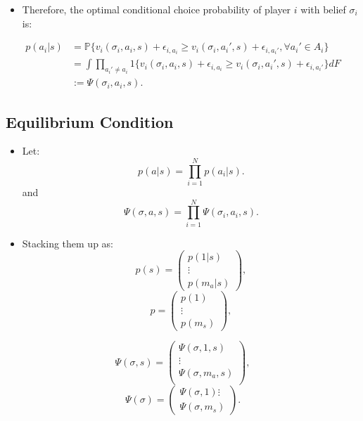 \documentclass[]{book}
\providecommand{\tightlist}{%
  \setlength{\itemsep}{0pt}\setlength{\parskip}{0pt}}
\begin{document}
\begin{itemize}
\tightlist
\item
  Therefore, the optimal conditional choice probability of player \(i\)
  with belief \(\sigma_i\) is:
\end{itemize}

\begin{equation}
\begin{split}
p(a_i|s) &= \mathbb{P}\{v_i(\sigma_i, a_i, s) + \epsilon_{i, a_i} \ge  v_i(\sigma_i, a_i', s) + \epsilon_{i, a_i'}, \forall a_i' \in A_i\}\\
&=\int \prod_{a_i' \neq a_i}1\{v_i(\sigma_i, a_i, s) + \epsilon_{i, a_i} \ge  v_i(\sigma_i, a_i', s) + \epsilon_{i, a_i'}\} d F\\
&:= \Psi(\sigma_i, a_i, s).
\end{split}
\end{equation}

\subsection{Equilibrium Condition}\label{equilibrium-condition-1}

\begin{itemize}
\tightlist
\item
  Let: \[
  p(a|s) = \prod_{i = 1}^N p(a_i|s).
  \] and \[
  \Psi(\sigma, a, s) = \prod_{i = 1}^N \Psi(\sigma_i, a_i, s).
  \]
\item
  Stacking them up as: \[
  p(s) = 
  \begin{pmatrix}
  p(1|s) \\
  \vdots \\
  p(m_a|s)
  \end{pmatrix},
  \] \[
  p = 
  \begin{pmatrix}
  p(1)\\
  \vdots\\
  p(m_s)
  \end{pmatrix},
  \]
\end{itemize}

\[
\Psi(\sigma, s) = 
\begin{pmatrix}
\Psi(\sigma, 1, s) \\
\vdots \\
\Psi(\sigma, m_a, s) \\
\end{pmatrix},
\] \[
\Psi(\sigma) = 
\begin{pmatrix}
\Psi(\sigma, 1)
\vdots\\
\Psi(\sigma, m_s)
\end{pmatrix}.
\]
\end{document}

